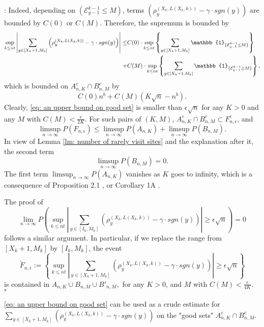 \documentclass[twoside,12pt,a4paper]{article}
\numberwithin{equation}{section}
\newenvironment{proof}{{\sc Proof}:}{~\hfill $\square$}
\newcommand{\abs}[1]{\left\vert #1 \right\vert}
\begin{document}
\begin{proof}
	Indeed, depending on $(\mathcal{E}^{k-1}_{y-1} \leq M)$, terms  $\left( \rho^{(X_k,L(X_k,k))}_y -  \gamma \cdot sgn(y) \right)$ are bounded by $C(0)$ or $C(M)$. Therefore, the supremum is bounded by
	\begin{align*}
	 \sup_{k\leq n t}  \abs{  	\sum_{y\in [X_{k}+1 ,M_k]} \left( \rho^{(X_k,L(X_k,k))}_y -  \gamma \cdot sgn(y) \right) } \leq &  
	 C(0) \cdot \sup_{k\leq n t} \left\{   	\sum_{y\in [X_{k}+1 ,M_k]} \mathbb{1}_{ \{ \mathcal{E}^{k-1}_{y-1} \leq M \} } \right\}
	 \notag
	 \\
	 +& C(M) \cdot \sup_{k\leq n t} \left\{   	\sum_{y\in [X_{k}+1 ,M_k]} \mathbb{1}_{ \{ \mathcal{E}^{k-1}_{y-1} \geq M \} } \right\},
\end{align*} which is bounded on $A^c_{n,K} \cap B^c_{n,M}$ by
\begin{equation}\label{eq: an upper bound on good set}
	C(0)n^b  + C(M) \left(K \sqrt{n} -n^b\right).
\end{equation} Clearly, \eqref{eq: an upper bound on good set} is smaller than $\epsilon \sqrt{n}$ for any $K>0$ and any $M$ with $C(M) < \frac{\epsilon}{2K}$. 
For such pairs of $(K,M)$, $A^c_{n,K} \cap B^c_{n,M} \subset F^c_{n,\epsilon}$, and 
$$
\limsup_{n\to \infty} P(F_{n,\epsilon}) \leq \limsup_{n\to \infty}  P(A_{n,K}) +  \limsup_{n\to \infty}  P(B_{n,M}).
$$ In view of Lemma \ref{lm: number of rarely visit sites} and the explanation after it, the second term $$\limsup_{n\to \infty}  P(B_{n,M})=0.$$  The first term $\limsup_{n\to \infty}  P(A_{n,K}) $ vanishes as $K$ goes to infinity, which is a consequence of Proposition 2.1 \cite{KMP22}, or Corollary 1A \cite{T96}.
 
The proof of 
$$  
\lim_{n\to\infty} P\left( \sup_{k\leq n t}  \abs{  	\sum_{y\in [I_k ,M_k]} \left( \rho^{(X_k,L(X_k,k))}_y -  \gamma \cdot sgn(y) \right) } \geq  \epsilon \sqrt{n}     \right) =0
$$ 
follows a similar argument. In particular, if we replace the range from $[X_k+1, M_k]$ by $[I_k,M_k]$, the event 
$$
\tilde{F}_{n,\epsilon}:= \left\{ \sup_{k\leq n t}  \abs{  	\sum_{y\in [X_{k}+1 ,M_{k}]} \left( \rho^{(X_k,L(X_k,k))}_y -  \gamma \cdot sgn(y) \right) } \geq  \epsilon \sqrt{n}    \right \}
$$ 
is contained in $A_{n,K} \cup B_{n,M} \cup  B'_{n,M},$ for any $K>0$, and $M$ with $C(M) < \frac{\epsilon}{4K}$.
\end{proof}

\eqref{eq: an upper bound on good set} can be used as a crude estimate for 	$\sum_{y\in [X_{k}+1 ,M_{k}]} \left( \rho^{(X_k,L(X_k,k))}_y -  \gamma \cdot sgn(y) \right)$   on the "good sets" $A^c_{n,K}\cap B^c_{n,M}$.
\end{document}
